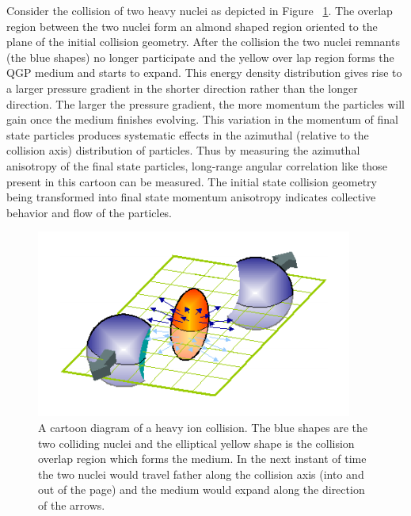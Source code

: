 Consider the collision of two heavy nuclei as depicted in Figure ~\ref{fig:flow_diagram_cart}. The overlap region between the two nuclei form an almond shaped region oriented to the plane of the initial collision geometry. After the collision the two nuclei remnants (the blue shapes) no longer participate and the yellow over lap region forms the QGP medium and starts to expand. This energy density distribution gives rise to a larger pressure gradient in the shorter direction rather than the longer direction. The larger the pressure gradient, the more momentum the particles will gain once the medium finishes evolving. This variation in the momentum of final state particles produces systematic effects in the azimuthal (relative to the collision axis) distribution of particles. Thus by measuring the azimuthal anisotropy of the final state particles, long-range angular correlation like those present in this cartoon can be measured. The initial state collision geometry being transformed into final state momentum anisotropy indicates collective behavior and flow of the particles.

\begin{figure}[!ht]
\begin{center}
\includegraphics[width=0.65\linewidth]{figs/flow_diagram_cartoon.png}
\caption{A cartoon diagram of a heavy ion collision. The blue shapes are the two colliding nuclei and the elliptical yellow shape is the collision overlap region which forms the medium. In the next instant of time the two nuclei would travel father along the collision axis (into and out of the page) and the medium would expand along the direction of the arrows.}
\end{center}
\label{fig:flow_diagram_cart}
\end{figure}

